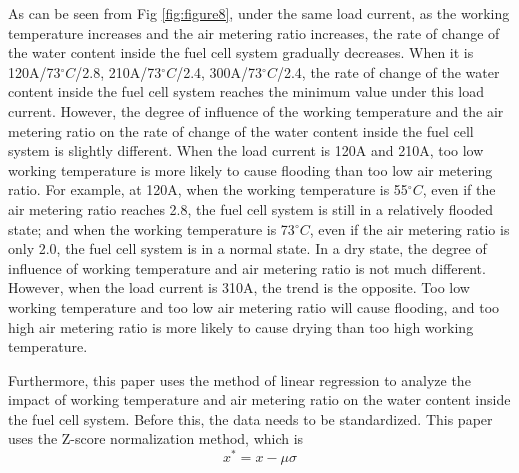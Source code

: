 
As can be seen from Fig \ref{fig:figure8}, under the same load current, as the working temperature increases and the air metering ratio increases, the rate of change of the water content inside the fuel cell system gradually decreases. When it is 120A/73$^{\circ}C$/2.8, 210A/73$^{\circ}C$/2.4, 300A/73$^{\circ}C$/2.4, the rate of change of the water content inside the fuel cell system reaches the minimum value under this load current. However, the degree of influence of the working temperature and the air metering ratio on the rate of change of the water content inside the fuel cell system is slightly different. When the load current is 120A and 210A, too low working temperature is more likely to cause flooding than too low air metering ratio. For example, at 120A, when the working temperature is 55$^{\circ}C$, even if the air metering ratio reaches 2.8, the fuel cell system is still in a relatively flooded state; and when the working temperature is 73$^{\circ}C$, even if the air metering ratio is only 2.0, the fuel cell system is in a normal state. In a dry state, the degree of influence of working temperature and air metering ratio is not much different. However, when the load current is 310A, the trend is the opposite. Too low working temperature and too low air metering ratio will cause flooding, and too high air metering ratio is more likely to cause drying than too high working temperature.

\par
Furthermore, this paper uses the method of linear regression to analyze the impact of working temperature and air metering ratio on the water content inside the fuel cell system. Before this, the data needs to be standardized. This paper uses the Z-score normalization method, which is
$$x^{*}=x-\mu\sigma$$

